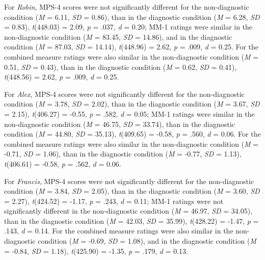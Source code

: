 \documentclass[
  american,
  man,mask,floatsintext]{apa6}
\begin{document}
For \emph{Robin}, MPS-4 scores were not significantly different for the non-diagnostic condition (\emph{M} = 6.11, \emph{SD} = 0.86), than in the diagnostic condition (\emph{M} = 6.28, \emph{SD} = 0.83), \emph{t}(448.03) = 2.09, \emph{p} = .037, \emph{d} = 0.20; MM-1 ratings were similar in the non-diagnostic condition (\emph{M} = 83.45, \emph{SD} = 14.86), and in the diagnostic condition (\emph{M} = 87.03, \emph{SD} = 14.14), \emph{t}(448.96) = 2.62, \emph{p} = .009, \emph{d} = 0.25. For the combined measure ratings were also similar in the non-diagnostic condition (\emph{M} = 0.51, \emph{SD} = 0.43), than in the diagnostic condition (\emph{M} = 0.62, \emph{SD} = 0.41), \emph{t}(448.56) = 2.62, \emph{p} = .009, \emph{d} = 0.25.

For \emph{Alex}, MPS-4 scores were not significantly different for the non-diagnostic condition (\emph{M} = 3.78, \emph{SD} = 2.02), than in the diagnostic condition (\emph{M} = 3.67, \emph{SD} = 2.15), \emph{t}(406.27) = -0.55, \emph{p} = .582, \emph{d} = 0.05; MM-1 ratings were similar in the non-diagnostic condition (\emph{M} = 46.75, \emph{SD} = 33.74), than in the diagnostic condition (\emph{M} = 44.80, \emph{SD} = 35.13), \emph{t}(409.65) = -0.58, \emph{p} = .560, \emph{d} = 0.06. For the combined measure ratings were also similar in the non-diagnostic condition (\emph{M} = -0.71, \emph{SD} = 1.06), than in the diagnostic condition (\emph{M} = -0.77, \emph{SD} = 1.13), \emph{t}(406.61) = -0.58, \emph{p} = .562, \emph{d} = 0.06.

For \emph{Francis}, MPS-4 scores were not significantly different for the non-diagnostic condition (\emph{M} = 3.84, \emph{SD} = 2.05), than in the diagnostic condition (\emph{M} = 3.60, \emph{SD} = 2.27), \emph{t}(424.52) = -1.17, \emph{p} = .243, \emph{d} = 0.11; MM-1 ratings were not significantly different in the non-diagnostic condition (\emph{M} = 46.97, \emph{SD} = 34.05), than in the diagnostic condition (\emph{M} = 42.03, \emph{SD} = 35.99), \emph{t}(428.22) = -1.47, \emph{p} = .143, \emph{d} = 0.14. For the combined measure ratings were also similar in the non-diagnostic condition (\emph{M} = -0.69, \emph{SD} = 1.08), and in the diagnostic condition (\emph{M} = -0.84, \emph{SD} = 1.18), \emph{t}(425.90) = -1.35, \emph{p} = .179, \emph{d} = 0.13.

\newpage


\clearpage
\renewcommand{\listfigurename}{Figure captions}

\clearpage
\renewcommand{\listtablename}{Table captions}
\end{document}
